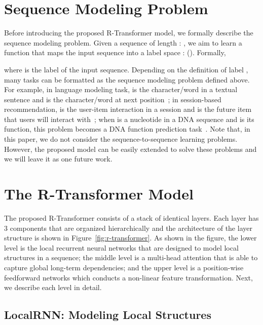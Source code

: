 \documentclass{article} \usepackage{iclr2019_conference,times}
\begin{document}
\section{Sequence Modeling Problem}
Before introducing the proposed R-Transformer model, we formally describe the sequence modeling problem. Given a sequence of length : , we aim to learn a function that maps the input sequence into a label space : (). Formally, 

\noindent where  is the label of the input sequence. Depending on the definition of label , many tasks can be formatted as the sequence modeling problem defined above. For example, in language modeling task,  is the character/word in a textual sentence and  is the character/word at next position~\citep{mikolov2010recurrent}; in session-based recommendation,  is the user-item interaction in a session and  is the future item that users will interact with~\citep{hidasi2015session}; when  is a nucleotide in a DNA sequence and  is its function, this problem becomes a DNA function prediction task~\citep{quang2016danq}. Note that, in this paper, we do not consider the sequence-to-sequence learning problems. However, the proposed model can be easily extended to solve these problems and we will leave it as one future work.

\section{The R-Transformer Model}
The proposed R-Transformer consists of a stack of identical layers. Each layer has 3 components that are organized hierarchically and the architecture of the layer structure is shown in Figure~\ref{fig:r-transformer}. As shown in the figure, the lower level is the local recurrent neural networks that are designed to model local structures in a sequence; the middle level is a multi-head attention that is able to capture global long-term dependencies; and the upper level is a position-wise feedforward networks which conducts a non-linear feature transformation. Next, we describe each level in detail.

\subsection{LocalRNN: Modeling Local Structures}
\end{document}
